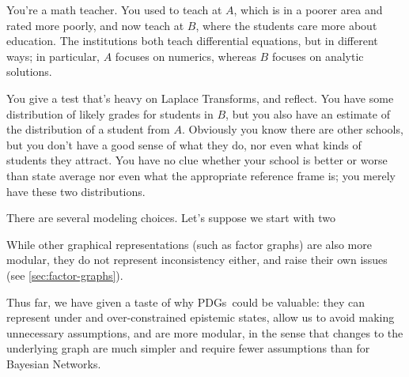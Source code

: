\documentclass{article}
\newcommand{\MN}{PDG}
\newcommand{\MNs}{\MN s}
\begin{document}
		
	\begin{example}
		You're a math teacher. You used to teach at $A$, which is in a poorer area and rated more poorly, and now teach at $B$, where the students care more about education. The institutions both teach differential equations, but in different ways; in particular, $A$ focuses on numerics, whereas $B$ focuses on analytic solutions.
		
		You give a test that's heavy on Laplace Transforms, and reflect.
		You have some distribution of likely grades for students in $B$, but you also have an estimate of the distribution of a student from $A$. 
		Obviously you know there are other schools, but you don't have a good sense of what they do, nor even what kinds of students they attract.
		You have no clue whether your school is better or worse than state average nor even what the appropriate reference frame is; you merely have these two distributions.
		
		There are several modeling choices. Let's suppose we start with two 
		
		
		\begin{center}
		\end{center}
		
		
		

	\end{example}


	
	While other graphical representations (such as factor graphs) are also more modular, they do not represent inconsistency either, and raise their own issues (see \cref{sec:factor-graphs}). 
	
	Thus far, we have given a taste of why \MNs\ could be valuable: they can represent under and over-constrained epistemic states, allow us to avoid making unnecessary assumptions, and are more modular, in the sense that changes to the underlying graph are much simpler and require fewer assumptions than for Bayesian Networks.	
	
\end{document}
